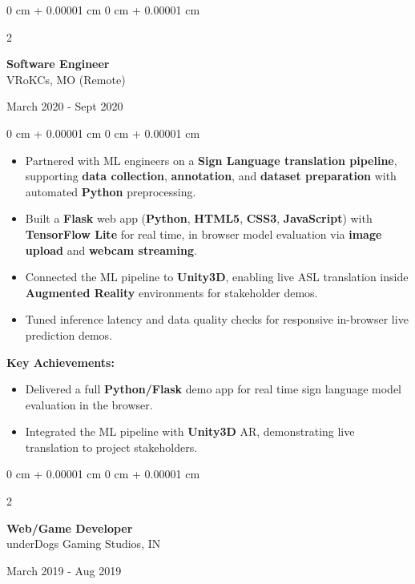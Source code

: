 \documentclass[10pt, letterpaper]{article}
\newenvironment{highlights}{
    \begin{itemize}[
        topsep=0.10 cm,
        parsep=0.10 cm,
        partopsep=0pt,
        itemsep=0pt,
        leftmargin=0 cm + 10pt
    ]
}{
    \end{itemize}
} %
\newenvironment{highlightsforbulletentries}{
    \begin{itemize}[
        topsep=0.10 cm,
        parsep=0.10 cm,
        partopsep=0pt,
        itemsep=0pt,
        leftmargin=10pt
    ]
}{
    \end{itemize}
} %
\newenvironment{onecolentry}{
    \begin{adjustwidth}{
        0 cm + 0.00001 cm
    }{
        0 cm + 0.00001 cm
    }
}{
    \end{adjustwidth}
} %
\newenvironment{twocolentry}[2][]{
    \onecolentry
    \def\secondColumn{#2}
    \setcolumnwidth{\fill, 4.5 cm}
    \begin{paracol}{2}
}{
    \switchcolumn \raggedleft \secondColumn
    \end{paracol}
    \endonecolentry
} %
\begin{document}
\vspace{0.15 cm}
\begin{twocolentry}{
	March 2020 - Sept 2020
}
\textbf{Software Engineer}\\
VRoKCs, MO (Remote)
\end{twocolentry}
\begin{onecolentry}
\begin{highlights}
	\item Partnered with ML engineers on a \textbf{Sign Language translation pipeline}, supporting \textbf{data collection}, \textbf{annotation}, and \textbf{dataset preparation} with automated \textbf{Python} preprocessing.
	\item Built a \textbf{Flask} web app (\textbf{Python}, \textbf{HTML5}, \textbf{CSS3}, \textbf{JavaScript}) with \textbf{TensorFlow Lite} for real time, in browser model evaluation via \textbf{image upload} and \textbf{webcam streaming}.
	\item Connected the ML pipeline to \textbf{Unity3D}, enabling live ASL translation inside \textbf{Augmented Reality} environments for stakeholder demos.
	\item Tuned inference latency and data quality checks for responsive in-browser live prediction demos.
\end{highlights}

\textbf{Key Achievements:}
\begin{highlightsforbulletentries}
	\item Delivered a full \textbf{Python/Flask} demo app for real time sign language model evaluation in the browser.
	\item Integrated the ML pipeline with \textbf{Unity3D} AR, demonstrating live translation to project stakeholders.
\end{highlightsforbulletentries}
\end{onecolentry}





\vspace{0.15 cm}
\begin{twocolentry}{
	March 2019 - Aug 2019
}
\textbf{Web/Game Developer}\\
underDogs Gaming Studios, IN
\end{twocolentry}
\end{document}
